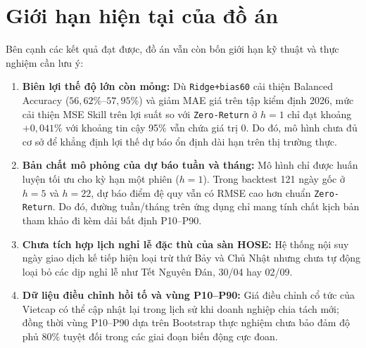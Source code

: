 \documentclass[12pt,a4paper]{report}
\begin{document}
\section{Giới hạn hiện tại của đồ án}
Bên cạnh các kết quả đạt được, đồ án vẫn còn bốn giới hạn kỹ thuật và thực nghiệm cần lưu ý:
\begin{enumerate}
    \item \textbf{Biên lợi thế độ lớn còn mỏng:} Dù \texttt{Ridge+bias60} cải thiện Balanced Accuracy ($56,62\%$--$57,95\%$) và giảm MAE giá trên tập kiểm định 2026, mức cải thiện MSE Skill trên lợi suất so với \nolinkurl{Zero-Return} ở $h=1$ chỉ đạt khoảng $+0,041\%$ với khoảng tin cậy 95\% vẫn chứa giá trị 0. Do đó, mô hình chưa đủ cơ sở để khẳng định lợi thế dự báo ổn định dài hạn trên thị trường thực.
    \item \textbf{Bản chất mô phỏng của dự báo tuần và tháng:} Mô hình chỉ được huấn luyện tối ưu cho kỳ hạn một phiên ($h=1$). Trong backtest 121 ngày gốc ở $h=5$ và $h=22$, dự báo điểm đệ quy vẫn có RMSE cao hơn chuẩn \nolinkurl{Zero-Return}. Do đó, đường tuần/tháng trên ứng dụng chỉ mang tính chất kịch bản tham khảo đi kèm dải bất định P10--P90.
    \item \textbf{Chưa tích hợp lịch nghỉ lễ đặc thù của sàn HOSE:} Hệ thống nội suy ngày giao dịch kế tiếp hiện loại trừ thứ Bảy và Chủ Nhật nhưng chưa tự động loại bỏ các dịp nghỉ lễ như Tết Nguyên Đán, 30/04 hay 02/09.
    \item \textbf{Dữ liệu điều chỉnh hồi tố và vùng P10--P90:} Giá điều chỉnh cổ tức của Vietcap có thể cập nhật lại trong lịch sử khi doanh nghiệp chia tách mới; đồng thời vùng P10--P90 dựa trên Bootstrap thực nghiệm chưa bảo đảm độ phủ $80\%$ tuyệt đối trong các giai đoạn biến động cực đoan.
\end{enumerate}
\end{document}
